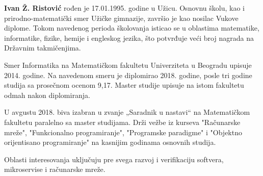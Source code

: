 \documentclass[12pt,oneside]{memoir}
\begin{document}
\frontmatter
\naslovna
\komisija
\apstrakt
\tableofcontents*

\mainmatter








\literatura

\backmatter

\begin{biografija}
  \textbf{Ivan Ž. Ristović} rođen je 17.01.1995. godine u Užicu. Osnovnu školu, kao i 
  prirodno-matematički smer Užičke gimnazije, završio je kao nosilac Vukove diplome. 
  Tokom navedenog perioda školovanja isticao se u oblastima matematike, informatike, 
  fizike, hemije i engleskog jezika, što potvrđuje veći broj nagrada na Državnim 
  takmičenjima.

  Smer Informatika na Matematičkom fakultetu Univerziteta u Beogradu upisuje 2014. 
  godine. Na navedenom smeru je diplomirao 2018. godine, posle tri godine studija 
  sa prosečnom ocenom 9,17. Master studije upisuje na istom fakultetu odmah nakon 
  diplomiranja.
  
  U avgustu 2018. biva izabran u zvanje „Saradnik u nastavi“ na Matematičkom 
  fakultetu paralelno sa master studijama. Drži vežbe iz kurseva "Računarske mreže",
  "Funkcionalno programiranje", "Programske paradigme" i "Objektno orijentisano 
  programiranje" na kasnijim godinama osnovnih studija.
  
  Oblasti interesovanja uključuju pre svega razvoj i verifikaciju softvera, mikroservise 
  i računarske mreže.
\end{biografija}
\end{document}
